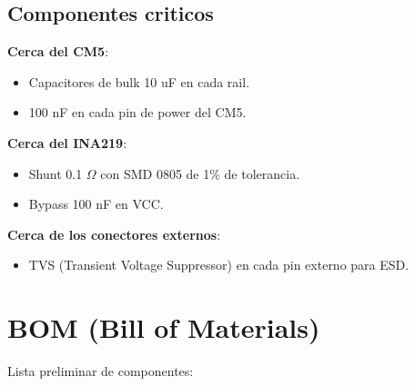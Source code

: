 \documentclass[11pt,a4paper,oneside,openright]{book}
\begin{document}
\section{Componentes criticos}

\textbf{Cerca del CM5}:
\begin{itemize}[leftmargin=2em]
  \item Capacitores de bulk 10 uF en cada rail.
  \item 100 nF en cada pin de power del CM5.
\end{itemize}

\textbf{Cerca del INA219}:
\begin{itemize}[leftmargin=2em]
  \item Shunt 0.1 $\Omega$ con SMD 0805 de 1\% de tolerancia.
  \item Bypass 100 nF en VCC.
\end{itemize}

\textbf{Cerca de los conectores externos}:
\begin{itemize}[leftmargin=2em]
  \item TVS (Transient Voltage Suppressor) en cada pin externo para ESD.
\end{itemize}

\chapter{BOM (Bill of Materials)}

Lista preliminar de componentes:
\end{document}
